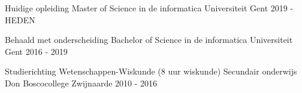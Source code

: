 

\begin{cventries}


    \cventry
    {Huidige opleiding}
    {Master of Science in de informatica} %
    {Universiteit Gent} %
    {2019 - HEDEN} %
    {}

    \cventry
    {Behaald met onderscheiding}
    {Bachelor of Science in de informatica} %
    {Universiteit Gent} %
    {2016 - 2019} %
    {}

    \cventry
    {Studierichting Wetenschappen-Wiskunde (8 uur wiskunde)}
    {Secundair onderwijs} %
    {Don Boscocollege Zwijnaarde} %
    {2010 - 2016} %
    {}

\end{cventries}
